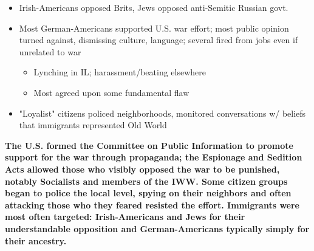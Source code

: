 \documentclass[a4paper]{article}
\begin{document}
{\begin{itemize}
                \begin{itemize}
                    \item Irish-Americans opposed Brits, Jews opposed anti-Semitic Russian govt.
                    \item Most German-Americans supported U.S. war effort; most public opinion turned against, dismissing culture, language; several fired from jobs even if unrelated to war 
                    \begin{itemize}
                        \item Lynching in IL; harassment/beating elsewhere
                        \item Most agreed upon some fundamental flaw
                    \end{itemize}
                    \item "Loyalist" citizens policed neighborhoods, monitored conversations w/ beliefs that immigrants represented Old World
                \end{itemize}
        \end{itemize}
        \textbf{The U.S. formed the Committee on Public Information to promote support for the war through propaganda; the Espionage and Sedition Acts allowed those who visibly opposed the war to be punished, notably Socialists and members of the IWW. Some citizen groups began to police the local level, spying on their neighbors and often attacking those who they feared resisted the effort. Immigrants were most often targeted: Irish-Americans and Jews for their understandable opposition and German-Americans typically simply for their ancestry.}}
\end{document}
